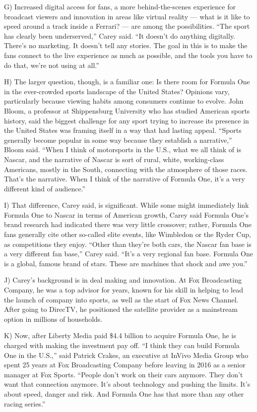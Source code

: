 \documentclass[UTF8,11pt]{ctexart}
\begin{document}
G) Increased digital access for fans, a more behind-the-scenes experience for broadcast viewers and innovation in areas like virtual reality — what is it like to speed around a track inside a Ferrari? — are among the possibilities. “The sport has clearly been underserved,” Carey said. “It doesn’t do anything digitally. There’s no marketing. It doesn’t tell any stories. The goal in this is to make the fans connect to the live experience as much as possible, and the tools you have to do that, we’re not using at all.”


H) The larger question, though, is a familiar one: Is there room for Formula One in the ever-crowded sports landscape of the United States? Opinions vary, particularly because viewing habits among consumers continue to evolve. John Bloom, a professor at Shippensburg University who has studied American sports history, said the biggest challenge for any sport trying to increase its presence in the United States was framing itself in a way that had lasting appeal. “Sports generally become popular in some way because they establish a narrative,” Bloom said. “When I think of motorsports in the U.S., what we all think of is Nascar, and the narrative of Nascar is sort of rural, white, working-class Americans, mostly in the South, connecting with the atmosphere of those races. That’s the narrative. When I think of the narrative of Formula One, it’s a very different kind of audience.”


I) That difference, Carey said, is significant. While some might immediately link Formula One to Nascar in terms of American growth, Carey said Formula One’s brand research had indicated there was very little crossover; rather, Formula One fans generally cite other so-called elite events, like Wimbledon or the Ryder Cup, as competitions they enjoy. “Other than they’re both cars, the Nascar fan base is a very different fan base,” Carey said. “It’s a very regional fan base. Formula One is a global, famous brand of stars. These are machines that shock and awe you.”


J) Carey’s background is in deal making and innovation. At Fox Broadcasting Company, he was a top advisor for years, known for his skill in helping to lead the launch of company into sports, as well as the start of Fox News Channel. After going to DirecTV, he positioned the satellite provider as a mainstream option in millions of households.


K) Now, after Liberty Media paid \$4.4 billion to acquire Formula One, he is charged with making the investment pay off. “I think they can build Formula One in the U.S.,” said Patrick Crakes, an executive at InVivo Media Group who spent 25 years at Fox Broadcasting Company before leaving in 2016 as a senior manager at Fox Sports. “People don’t work on their cars anymore. They don’t want that connection anymore. It’s about technology and pushing the limits. It’s about speed, danger and risk. And Formula One has that more than any other racing series.”
\end{document}
